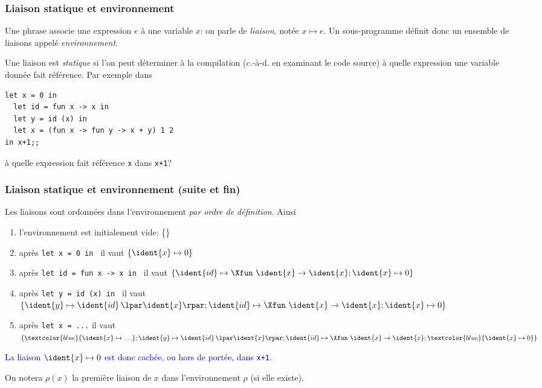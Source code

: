 %
\begin{frame}[containsverbatim]
\frametitle{Liaison statique et environnement}
\label{exemple_liaisons}

Une phrase associe une expression $e$ à une variable $x$: on parle de
\emph{liaison}, notée $x \mapsto e$. Un sous-programme définit donc un
ensemble de liaisons appelé \emph{environnement}.

\bigskip

Une liaison est \emph{statique} si l'on peut déterminer à la
compilation (c.-à-d. en examinant le code source) à quelle expression
une variable donnée fait référence. Par exemple dans {\small
\begin{verbatim}
let x = 0 in
  let id = fun x -> x in
  let y = id (x) in
  let x = (fun x -> fun y -> x + y) 1 2
in x+1;;
\end{verbatim}
}
à quelle expression fait référence \verb+x+ dans \verb|x+1|?

\end{frame}

%
\begin{frame}[containsverbatim]
\frametitle{Liaison statique et environnement (suite et fin)}

Les liaisons sont ordonnées dans l'environnement \emph{par ordre de
définition}. Ainsi
\begin{enumerate}

  \item l'environnement est initialement vide: \{\}

  \item après {\small \verb|let x = 0 in |} il vaut $\{\ident{x} \mapsto
  0\}$

  \item après {\small \verb|let id = fun x -> x in |} il vaut
  $\{\ident{id} \mapsto \Xfun \,\, \ident{x} \rightarrow \ident{x}; \ident{x}
  \mapsto 0\}$

  \item après {\small \verb|let y = id (x) in |} il vaut $\{\ident{y}
  \mapsto \ident{id} \, \lpar\ident{x}\rpar; \ident{id} \mapsto \Xfun \,\,
  \ident{x} \rightarrow \ident{x}; \ident{x} \mapsto 0\}$

  \item après {\small \verb|let x = ...|} il vaut $\{\textcolor{blue}{\ident{x}
  \mapsto \ldots}; \ident{y} \mapsto \ident{id} \, \lpar\ident{x}\rpar; \ident{id}
  \mapsto \Xfun \,\, \ident{x} \rightarrow \ident{x}; \textcolor{blue}{\ident{x} \mapsto
  0}\}$

\end{enumerate}

\textcolor{blue}{La liaison $\ident{x} \mapsto 0$ est donc cachée, ou hors de
portée, dans \texttt{x+1}.}

\bigskip

On notera $\rho(x)$ la première liaison de $x$ dans l'environnement
$\rho$ (si elle existe).

\end{frame}


